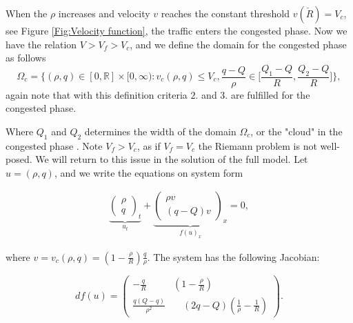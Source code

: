 \documentclass[10pt]{article}
\numberwithin{equation}{section}
\begin{document}
When the $\rho$ increases and velocity $v$ reaches the constant threshold $v(\check R) = V_c$, see Figure \ref{Fig:Velocity function}, the traffic enters the congested phase. Now we have the relation $ V > V_f > V_c $, and we define the domain for the congested phase as follows \begin{equation}
    \Omega_c = \Bigg\{(\rho, q) \in [0, \mathbb{R}] \times [0, \infty) : v_c(\rho, q) \leq V_c, \frac{q-Q}{\rho} \in \Bigg[\frac{Q_1 - Q}{R}, \frac{Q_2 - Q}{R} \Bigg]  \Bigg\},
    \label{Domain congested ph}
\end{equation} again note that with this definition criteria $2.$ and $3.$ are fulfilled for the congested phase. 
\begin{figure}
    
\end{figure}{}
Where $Q_1$ and $Q_2$ determines the width of the domain $\Omega_{c}$, or the "cloud" in the congested phase \cite{Colombo2003}. Note $V_f > V_c$, as if $V_f = V_c$ the Riemann problem is not well-posed. We will return to this issue in the solution of the full model. Let $ u = (\rho, q)$, and we write the equations on system form

\begin{align*}
    \underbrace{\begin{pmatrix} \rho \\ q \end{pmatrix}_t}_{u_t} +  \underbrace{\begin{pmatrix} \rho v  \\ (q - Q) v \end{pmatrix}_x}_{f(u)_x} = 0, 
\end{align*}

where $v = v_c(\rho,  q) = (1 - \frac{\rho}{R}) \frac{q}{\rho}$. The system has the following Jacobian:

\begin{equation*}
    df(u) =\begin{pmatrix} -\frac{q}{R} & (1- \frac{\rho}{R}) \\ 
                            \frac{q(Q-q)}{\rho ^2} & \quad (2q -Q)(\frac{1}{\rho} - \frac{1}{R}) \end{pmatrix}.
\end{equation*}
\end{document}
